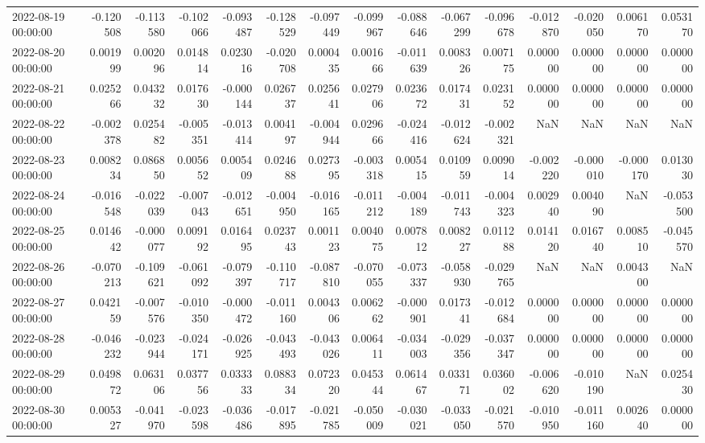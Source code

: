 \begin{tabular}{lrrrrrrrrrrrrrr}
2022-08-19 00:00:00 & -0.120508 & -0.113580 & -0.102066 & -0.093487 & -0.128529 & -0.097449 & -0.099967 & -0.088646 & -0.067299 & -0.096678 & -0.012870 & -0.020050 & 0.006170 & 0.053170 \\
2022-08-20 00:00:00 & 0.001999 & 0.002096 & 0.014814 & 0.023016 & -0.020708 & 0.000435 & 0.001666 & -0.011639 & 0.008326 & 0.007175 & 0.000000 & 0.000000 & 0.000000 & 0.000000 \\
2022-08-21 00:00:00 & 0.025266 & 0.043232 & 0.017630 & -0.000144 & 0.026737 & 0.025641 & 0.027906 & 0.023672 & 0.017431 & 0.023152 & 0.000000 & 0.000000 & 0.000000 & 0.000000 \\
2022-08-22 00:00:00 & -0.002378 & 0.025482 & -0.005351 & -0.013414 & 0.004197 & -0.004944 & 0.029666 & -0.024416 & -0.012624 & -0.002321 & NaN & NaN & NaN & NaN \\
2022-08-23 00:00:00 & 0.008234 & 0.086850 & 0.005652 & 0.005409 & 0.024688 & 0.027395 & -0.003318 & 0.005415 & 0.010959 & 0.009014 & -0.002220 & -0.000010 & -0.000170 & 0.013030 \\
2022-08-24 00:00:00 & -0.016548 & -0.022039 & -0.007043 & -0.012651 & -0.004950 & -0.016165 & -0.011212 & -0.004189 & -0.011743 & -0.004323 & 0.002940 & 0.004090 & NaN & -0.053500 \\
2022-08-25 00:00:00 & 0.014642 & -0.000077 & 0.009192 & 0.016495 & 0.023743 & 0.001123 & 0.004075 & 0.007812 & 0.008227 & 0.011288 & 0.014120 & 0.016740 & 0.008510 & -0.045570 \\
2022-08-26 00:00:00 & -0.070213 & -0.109621 & -0.061092 & -0.079397 & -0.110717 & -0.087810 & -0.070055 & -0.073337 & -0.058930 & -0.029765 & NaN & NaN & 0.004300 & NaN \\
2022-08-27 00:00:00 & 0.042159 & -0.007576 & -0.010350 & -0.000472 & -0.011160 & 0.004306 & 0.006262 & -0.000901 & 0.017341 & -0.012684 & 0.000000 & 0.000000 & 0.000000 & 0.000000 \\
2022-08-28 00:00:00 & -0.046232 & -0.023944 & -0.024171 & -0.026925 & -0.043493 & -0.043026 & 0.006411 & -0.034003 & -0.029356 & -0.037347 & 0.000000 & 0.000000 & 0.000000 & 0.000000 \\
2022-08-29 00:00:00 & 0.049872 & 0.063106 & 0.037756 & 0.033333 & 0.088334 & 0.072320 & 0.045344 & 0.061467 & 0.033171 & 0.036002 & -0.006620 & -0.010190 & NaN & 0.025430 \\
2022-08-30 00:00:00 & 0.005327 & -0.041970 & -0.023598 & -0.036486 & -0.017895 & -0.021785 & -0.050009 & -0.030021 & -0.033050 & -0.021570 & -0.010950 & -0.011160 & 0.002640 & 0.000000 \\

\end{tabular}
